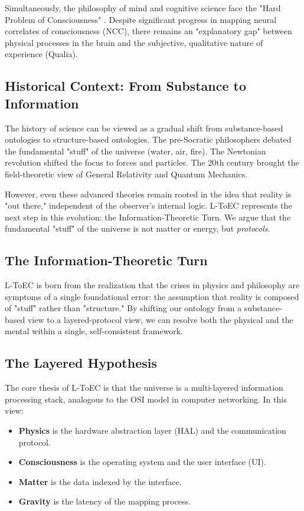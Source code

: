 \documentclass[11pt,onecolumn]{article}
\begin{document}
Simultaneously, the philosophy of mind and cognitive science face the "Hard Problem of Consciousness" \cite{chalmers}. Despite significant progress in mapping neural correlates of consciousness (NCC), there remains an "explanatory gap" between physical processes in the brain and the subjective, qualitative nature of experience (Qualia). 

\subsection{Historical Context: From Substance to Information}
The history of science can be viewed as a gradual shift from substance-based ontologies to structure-based ontologies. The pre-Socratic philosophers debated the fundamental "stuff" of the universe (water, air, fire). The Newtonian revolution shifted the focus to forces and particles. The 20th century brought the field-theoretic view of General Relativity and Quantum Mechanics. 

However, even these advanced theories remain rooted in the idea that reality is "out there," independent of the observer's internal logic. L-ToEC represents the next step in this evolution: the Information-Theoretic Turn. We argue that the fundamental "stuff" of the universe is not matter or energy, but \textit{protocols}.

\subsection{The Information-Theoretic Turn}
L-ToEC is born from the realization that the crises in physics and philosophy are symptoms of a single foundational error: the assumption that reality is composed of "stuff" rather than "structure." By shifting our ontology from a substance-based view to a layered-protocol view, we can resolve both the physical and the mental within a single, self-consistent framework.

\subsection{The Layered Hypothesis}
The core thesis of L-ToEC is that the universe is a multi-layered information processing stack, analogous to the OSI model in computer networking. In this view:
\begin{itemize}
    \item \textbf{Physics} is the hardware abstraction layer (HAL) and the communication protocol.
    \item \textbf{Consciousness} is the operating system and the user interface (UI).
    \item \textbf{Matter} is the data indexed by the interface.
    \item \textbf{Gravity} is the latency of the mapping process.
\end{itemize}
\end{document}
